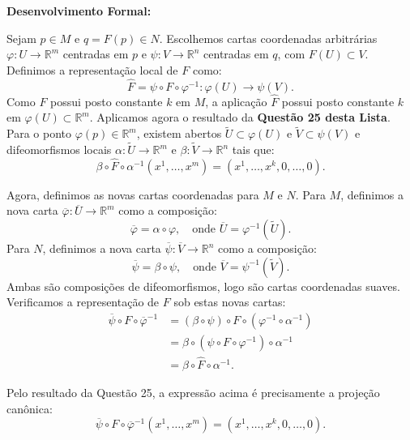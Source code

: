 {	\textbf{Desenvolvimento Formal:}
	
	Sejam $p \in M$ e $q = F(p) \in N$. Escolhemos cartas coordenadas arbitrárias $\varphi : U \to \mathbb{R}^m$ centradas em $p$ e $\psi : V \to \mathbb{R}^n$ centradas em $q$, com $F(U) \subset V$. Definimos a representação local de $F$ como:
	\begin{equation*}
		\hat{F} = \psi \circ F \circ \varphi^{-1} : \varphi(U) \to \psi(V).
	\end{equation*}
	Como $F$ possui posto constante $k$ em $M$, a aplicação $\hat{F}$ possui posto constante $k$ em $\varphi(U) \subset \mathbb{R}^m$. Aplicamos agora o resultado da \textbf{Questão 25 desta Lista}. Para o ponto $\varphi(p) \in \mathbb{R}^m$, existem abertos $\tilde{U} \subset \varphi(U)$ e $\tilde{V} \subset \psi(V)$ e difeomorfismos locais $\alpha : \tilde{U} \to \mathbb{R}^m$ e $\beta : \tilde{V} \to \mathbb{R}^n$ tais que:
	\begin{equation*}
		\beta \circ \hat{F} \circ \alpha^{-1}(x^1, \dots, x^m) = (x^1, \dots, x^k, 0, \dots, 0).
	\end{equation*}
	
	Agora, definimos as novas cartas coordenadas para $M$ e $N$. Para $M$, definimos a nova carta $\overline{\varphi} : \overline{U} \to \mathbb{R}^m$ como a composição:
	\begin{equation*}
		\overline{\varphi} = \alpha \circ \varphi, \quad \text{onde } \overline{U} = \varphi^{-1}(\tilde{U}).
	\end{equation*}
	Para $N$, definimos a nova carta $\overline{\psi} : \overline{V} \to \mathbb{R}^n$ como a composição:
	\begin{equation*}
		\overline{\psi} = \beta \circ \psi, \quad \text{onde } \overline{V} = \psi^{-1}(\tilde{V}).
	\end{equation*}
	Ambas são composições de difeomorfismos, logo são cartas coordenadas suaves. Verificamos a representação de $F$ sob estas novas cartas:
	\begin{align*}
		\overline{\psi} \circ F \circ \overline{\varphi}^{-1} &= (\beta \circ \psi) \circ F \circ (\varphi^{-1} \circ \alpha^{-1}) \\
		&= \beta \circ (\psi \circ F \circ \varphi^{-1}) \circ \alpha^{-1} \\
		&= \beta \circ \hat{F} \circ \alpha^{-1}.
	\end{align*}
	
	Pelo resultado da Questão 25, a expressão acima é precisamente a projeção canônica:
	\begin{equation*}
		\overline{\psi} \circ F \circ \overline{\varphi}^{-1}(x^1, \dots, x^m) = (x^1, \dots, x^k, 0, \dots, 0).
	\end{equation*}
}

